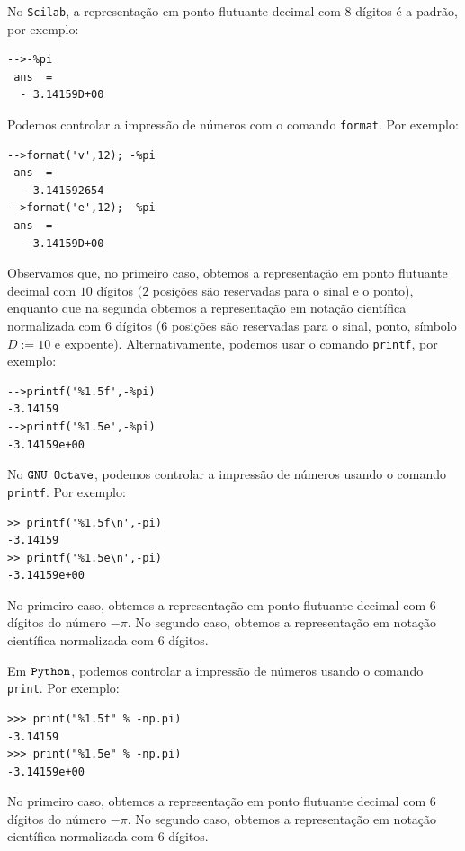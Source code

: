 \ifisscilab
\begin{obs}
No \verb+Scilab+, a representação em ponto flutuante decimal com $8$ dígitos é a padrão, por exemplo:
\begin{verbatim}
-->-%pi
 ans  =
  - 3.14159D+00 
\end{verbatim}
Podemos controlar a impressão de números com o comando \verb+format+. Por exemplo:
\begin{verbatim}
-->format('v',12); -%pi
 ans  =
  - 3.141592654  
-->format('e',12); -%pi
 ans  =
  - 3.14159D+00  
\end{verbatim}
Observamos que, no primeiro caso, obtemos a representação em ponto flutuante decimal com $10$ dígitos ($2$ posições são reservadas para o sinal e o ponto), enquanto que na segunda obtemos a representação em notação científica normalizada com $6$ dígitos ($6$ posições são reservadas para o sinal, ponto, símbolo $D := 10$ e expoente). Alternativamente, podemos usar o comando \verb+printf+, por exemplo:
\begin{verbatim}
-->printf('%1.5f',-%pi)
-3.14159 
-->printf('%1.5e',-%pi)
-3.14159e+00 
\end{verbatim}
\end{obs}
\fi
\ifisoctave
\begin{obs}
No $\verb+GNU Octave+$, podemos controlar a impressão de números usando o comando \verb+printf+. Por exemplo:
\begin{verbatim}
>> printf('%1.5f\n',-pi)
-3.14159
>> printf('%1.5e\n',-pi)
-3.14159e+00
\end{verbatim}
No primeiro caso, obtemos a representação em ponto flutuante decimal com $6$ dígitos do número $-\pi$. No segundo caso, obtemos a representação em notação científica normalizada com $6$ dígitos.  
\end{obs}
\fi
\ifispython
\begin{obs}
Em $\verb+Python+$, podemos controlar a impressão de números usando o comando \verb+print+. Por exemplo:
\begin{verbatim}
>>> print("%1.5f" % -np.pi)
-3.14159
>>> print("%1.5e" % -np.pi)
-3.14159e+00
\end{verbatim}
No primeiro caso, obtemos a representação em ponto flutuante decimal com $6$ dígitos do número $-\pi$. No segundo caso, obtemos a representação em notação científica normalizada com $6$ dígitos.  
\end{obs}
\fi

